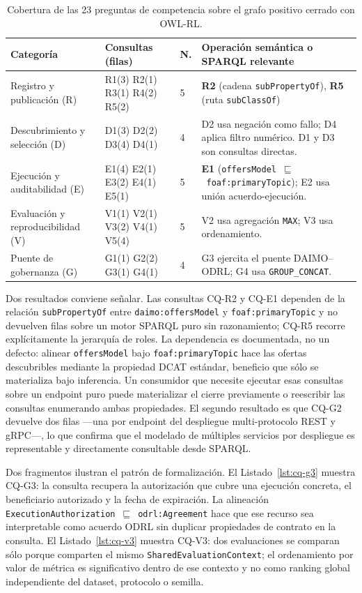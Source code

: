 \documentclass[Afour,sagev,times]{sagej}
\newcommand{\code}[1]{\texttt{#1}}
\begin{document}
\begin{table}[tb]
\scriptsize\sf\centering
\caption{Cobertura de las 23 preguntas de competencia sobre el grafo positivo cerrado con OWL-RL.\label{tab:cqs}}
\begin{tabular}{@{}p{3.3cm}p{2.6cm}p{0.8cm}p{6.3cm}@{}}
\toprule
\textbf{Categoría} & \textbf{Consultas (filas)} & \textbf{N.} & \textbf{Operación semántica o SPARQL relevante} \\
\midrule
Registro y publicación (R) & R1(3) R2(1) R3(1) R4(2) R5(2) & 5 & \textbf{R2} (cadena \code{subPropertyOf}), \textbf{R5} (ruta \code{subClassOf}) \\
Descubrimiento y selección (D) & D1(3) D2(2) D3(4) D4(1) & 4 & D2 usa negación como fallo; D4 aplica filtro numérico. D1 y D3 son consultas directas. \\
Ejecución y auditabilidad (E) & E1(4) E2(1) E3(2) E4(1) E5(1) & 5 & \textbf{E1} (\code{offersModel}~$\sqsubseteq$~\code{foaf:primaryTopic}); E2 usa unión acuerdo-ejecución. \\
Evaluación y reproducibilidad (V) & V1(1) V2(1) V3(2) V4(1) V5(4) & 5 & V2 usa agregación \code{MAX}; V3 usa ordenamiento. \\
Puente de gobernanza (G) & G1(1) G2(2) G3(1) G4(1) & 4 & G3 ejercita el puente DAIMO--ODRL; G4 usa \code{GROUP\_CONCAT}. \\
\bottomrule
\end{tabular}
\end{table}

Dos resultados conviene señalar. Las consultas CQ-R2 y CQ-E1 dependen de la relación \code{subPropertyOf} entre \code{daimo:offersModel} y \code{foaf:primaryTopic} y no devuelven filas sobre un motor SPARQL puro sin razonamiento; CQ-R5 recorre explícitamente la jerarquía de roles. La dependencia es documentada, no un defecto: alinear \code{offersModel} bajo \code{foaf:primaryTopic} hace las ofertas descubribles mediante la propiedad DCAT estándar, beneficio que sólo se materializa bajo inferencia. Un consumidor que necesite ejecutar esas consultas sobre un endpoint puro puede materializar el cierre previamente o reescribir las consultas enumerando ambas propiedades. El segundo resultado es que CQ-G2 devuelve dos filas ---una por endpoint del despliegue multi-protocolo REST y gRPC---, lo que confirma que el modelado de múltiples servicios por despliegue es representable y directamente consultable desde SPARQL.

Dos fragmentos ilustran el patrón de formalización. El Listado~\ref{lst:cq-g3} muestra CQ-G3: la consulta recupera la autorización que cubre una ejecución concreta, el beneficiario autorizado y la fecha de expiración. La alineación \code{ExecutionAuthorization}~$\sqsubseteq$~\code{odrl:Agreement} hace que ese recurso sea interpretable como acuerdo ODRL sin duplicar propiedades de contrato en la consulta. El Listado~\ref{lst:cq-v3} muestra CQ-V3: dos evaluaciones se comparan sólo porque comparten el mismo \code{SharedEvaluationContext}; el ordenamiento por valor de métrica es significativo dentro de ese contexto y no como ranking global independiente del dataset, protocolo o semilla.
\end{document}
